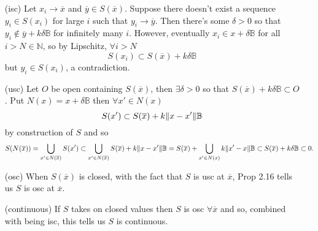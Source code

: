 \documentclass{article}
\newenvironment{ex}[1]
  {\renewcommand\theexercise{#1}\exercise}
  {\endexercise}
\newcommand{\B}{\mathbb{B}}
\begin{document}
\begin{ex}{2.18}
  \newcommand{\xb}{\overline{x}}
  \newcommand{\yb}{\overline{y}}
  \begin{itemize} \, \\
    \item[(isc)] Let $x_i \to \xb$ and $\yb \in S(\xb)$. Suppose there doesn't exist a sequence $y_i \in S(x_i)$ for large $i$ such that $y_i \to \yb$. Then there's some $\delta > 0$ so that $y_i \not\in \yb + k\delta\B$ for infinitely many $i$. However, eventually $x_i \in x + \delta\B$ for all $i > N \in \mathbb{N}$, so by Lipschitz, $\forall i > N$
      $$
      S(x_i) \subset S(\xb) + k\delta\B
      $$
      but $y_i \in S(x_i)$, a contradiction.
    \item[(usc)]
      Let $O$ be open containing $S(\xb)$, then $\exists \delta > 0$ so that $S(\xb) + k\delta\B \subset O$. Put $N(x) = x + \delta \B$ then $\forall x' \in N(x)$
      $$
      S(x') \subset S(\xb) + k\norm{x - x'}\B
      $$
      by construction of $S$ and so
      $$
      S(N(\xb)) = \bigcup_{x' \in N(\xb)} S(x') \subset \bigcup_{x' \in N(\xb)} S(\xb) + k\norm{x - x'}\B = S(\xb) + \bigcup_{x' \in N(x)} k\norm{x' - x}\B \subset S(\xb) + k\delta\B \subset 0.
      $$
    \item[(osc)]
      When $S(\xb)$ is closed, with the fact that $S$ is usc at $\xb$, Prop 2.16 tells us $S$ is osc at $\xb$.
    \item[(continuous)]
      If $S$ takes on closed values then $S$ is osc $\forall \xb$ and so, combined with being isc, this tells us $S$ is continuous.
  \end{itemize}
\end{ex}
\end{document}
